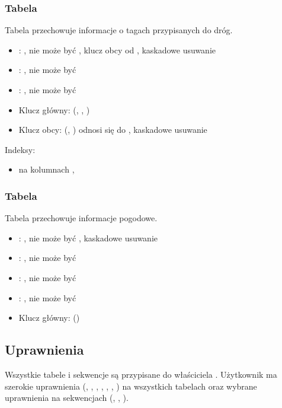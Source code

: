 \subsubsection{Tabela }
Tabela przechowuje informacje o tagach przypisanych do dróg.
\begin{itemize}
    \item {}: , nie może być , klucz obcy od , kaskadowe usuwanie
    \item {}: , nie może być 
    \item {}: , nie może być 
    \item Klucz główny: (, , )
    \item Klucz obcy: (, ) odnosi się do , kaskadowe usuwanie
\end{itemize}
Indeksy:
\begin{itemize}
    \item {} na kolumnach , 
\end{itemize}

\subsubsection{Tabela }
Tabela przechowuje informacje pogodowe.
\begin{itemize}
    \item {}: , nie może być , kaskadowe usuwanie
    \item {}: , nie może być 
    \item {}: , nie może być 
    \item {}: , nie może być 
    \item Klucz główny: ()
\end{itemize}

\subsection{Uprawnienia}
Wszystkie tabele i sekwencje są przypisane do właściciela .
Użytkownik  ma szerokie uprawnienia (, , , , , , ) na wszystkich tabelach oraz wybrane uprawnienia na sekwencjach (, , ).

